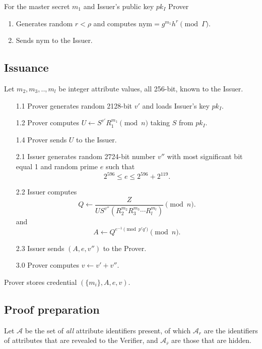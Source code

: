 \documentclass[a4paper]{article}
\begin{document}
For the master secret $m_1$ and Issuer's public key $pk_I$ Prover 
\begin{enumerate}
\item Generates random $r<\rho$ and computes
$\mathrm{nym} = g^{m_1}h^{r}\pmod{\Gamma}$.
\item Sends $\mathrm{nym}$ to the Issuer.
\end{enumerate}


\subsection{Issuance}
Let $m_2,m_3,..,m_l$ be integer attribute values, all 256-bit, known to the Issuer. 
\begin{enumerate}
\item [1.1] Prover generates random 2128-bit $v'$ and loads Issuer's key $pk_I$.
\item [1.2] Prover computes $
U \leftarrow S^{v'}R_1^{m_1}\pmod{n}$ taking $S$ from $pk_I$.
\item [1.4] Prover sends $U$ to the Issuer.
\item [2.1] Issuer generates  random 2724-bit number $v''$ with most significant bit equal 1 and random prime  $e$ such that
$$
2^{596}\leq e \leq 2^{596}+ 2^{119}.
$$
\item [2.2] Issuer computes 
$$
Q \leftarrow \frac{Z}{U S^{v''}(R_2^{m_2}R_3^{m_3}\cdots  R_l^{m_l})}\pmod{n}.
$$
and
$$
A \leftarrow Q^{e^{-1}\pmod{p'q'}}\pmod{n}.
$$
\item [2.3] Issuer sends $(A,e,v'')$ to the Prover.
\item [3.0] Prover computes $v \leftarrow v'+v''$.
\end{enumerate}
Prover stores credential $(\{m_i\},A,e,v)$.

\subsection{Proof preparation}
Let $\mathcal{A}$ be the set of \emph{all} attribute identifiers present, of which  $\mathcal{A}_r$ are the identifiers of attributes  that are revealed to the Verifier, and $\mathcal{A}_{\overline{r}}$ are those that are hidden.
\end{document}

